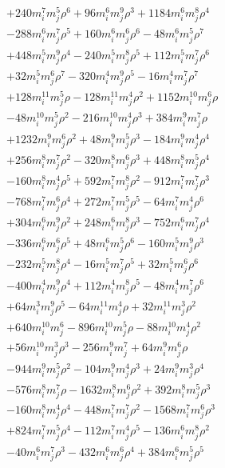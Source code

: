 {\begin{align*}
&+240m_i^{7}m_j^{5}\rho^{6}+96m_i^{6}m_j^{9}\rho^{3}+1184m_i^{6}m_j^{8}\rho^{4}\\
&-288m_i^{6}m_j^{7}\rho^{5}+160m_i^{6}m_j^{6}\rho^{6}-48m_i^{6}m_j^{5}\rho^{7}\\
&+448m_i^{5}m_j^{9}\rho^{4}-240m_i^{5}m_j^{8}\rho^{5}+112m_i^{5}m_j^{7}\rho^{6}\\
&+32m_i^{5}m_j^{6}\rho^{7}-320m_i^{4}m_j^{9}\rho^{5}-16m_i^{4}m_j^{7}\rho^{7}\\
&+128m_i^{11}m_j^{5}\rho-128m_i^{11}m_j^{4}\rho^{2}+1152m_i^{10}m_j^{6}\rho\\
&-48m_i^{10}m_j^{5}\rho^{2}-216m_i^{10}m_j^{4}\rho^{3}+384m_i^{9}m_j^{7}\rho\\
&+1232m_i^{9}m_j^{6}\rho^{2}+48m_i^{9}m_j^{5}\rho^{3}-184m_i^{9}m_j^{4}\rho^{4}\\
&+256m_i^{8}m_j^{7}\rho^{2}-320m_i^{8}m_j^{6}\rho^{3}+448m_i^{8}m_j^{5}\rho^{4}\\
&-160m_i^{8}m_j^{4}\rho^{5}+592m_i^{7}m_j^{8}\rho^{2}-912m_i^{7}m_j^{7}\rho^{3}\\
&-768m_i^{7}m_j^{6}\rho^{4}+272m_i^{7}m_j^{5}\rho^{5}-64m_i^{7}m_j^{4}\rho^{6}\\
&+304m_i^{6}m_j^{9}\rho^{2}+248m_i^{6}m_j^{8}\rho^{3}-752m_i^{6}m_j^{7}\rho^{4}\\
&-336m_i^{6}m_j^{6}\rho^{5}+48m_i^{6}m_j^{5}\rho^{6}-160m_i^{5}m_j^{9}\rho^{3}\\
&-232m_i^{5}m_j^{8}\rho^{4}-16m_i^{5}m_j^{7}\rho^{5}+32m_i^{5}m_j^{6}\rho^{6}\\
&-400m_i^{4}m_j^{9}\rho^{4}+112m_i^{4}m_j^{8}\rho^{5}-48m_i^{4}m_j^{7}\rho^{6}\\
&+64m_i^{3}m_j^{9}\rho^{5}-64m_i^{11}m_j^{4}\rho+32m_i^{11}m_j^{3}\rho^{2}\\
&+640m_i^{10}m_j^{6}-896m_i^{10}m_j^{5}\rho-88m_i^{10}m_j^{4}\rho^{2}\\
&+56m_i^{10}m_j^{3}\rho^{3}-256m_i^{9}m_j^{7}+64m_i^{9}m_j^{6}\rho\\
&-944m_i^{9}m_j^{5}\rho^{2}-104m_i^{9}m_j^{4}\rho^{3}+24m_i^{9}m_j^{3}\rho^{4}\\
&-576m_i^{8}m_j^{7}\rho-1632m_i^{8}m_j^{6}\rho^{2}+392m_i^{8}m_j^{5}\rho^{3}\\
&-160m_i^{8}m_j^{4}\rho^{4}-448m_i^{7}m_j^{7}\rho^{2}-1568m_i^{7}m_j^{6}\rho^{3}\\
&+824m_i^{7}m_j^{5}\rho^{4}-112m_i^{7}m_j^{4}\rho^{5}-136m_i^{6}m_j^{8}\rho^{2}\\
&-40m_i^{6}m_j^{7}\rho^{3}-432m_i^{6}m_j^{6}\rho^{4}+384m_i^{6}m_j^{5}\rho^{5}\\

\end{align*}}
